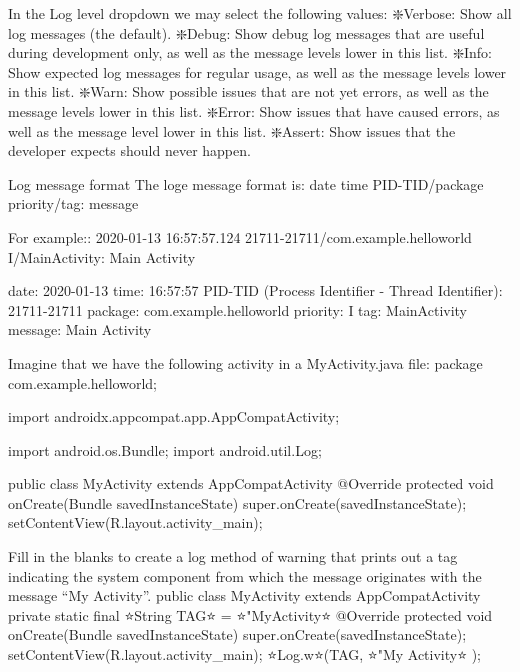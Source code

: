         In the Log level dropdown we may select the following values:
            ❇️Verbose: Show all log messages (the default).
            ❇️Debug: Show debug log messages that are useful during development only, as well as the message levels lower in this list.
            ❇️Info: Show expected log messages for regular usage, as well as the message levels lower in this list.
            ❇️Warn: Show possible issues that are not yet errors, as well as the message levels lower in this list.
            ❇️Error: Show issues that have caused errors, as well as the message level lower in this list.
            ❇️Assert: Show issues that the developer expects should never happen.

    Log message format
        The loge message format is:
            date time PID-TID/package priority/tag: message

        For example::
            2020-01-13 16:57:57.124 21711-21711/com.example.helloworld I/MainActivity: Main Activity

        date: 2020-01-13
        time: 16:57:57
        PID-TID (Process Identifier - Thread Identifier): 21711-21711
        package: com.example.helloworld
        priority: I
        tag: MainActivity
        message: Main Activity


        Imagine that we have the following activity in a MyActivity.java file:
            package com.example.helloworld;
            
            import androidx.appcompat.app.AppCompatActivity;
            
            import android.os.Bundle;
            import android.util.Log;
            
            public class MyActivity extends AppCompatActivity {
                @Override
                protected void onCreate(Bundle savedInstanceState) {
                    super.onCreate(savedInstanceState);
                    setContentView(R.layout.activity_main);
                }
            }

        Fill in the blanks to create a log method of warning that prints out a tag indicating the system component from which the message originates with the message “My Activity”.
            public class MyActivity extends AppCompatActivity {
                private static final ⭐String TAG⭐ = ⭐"MyActivity⭐ 
                @Override
                protected void onCreate(Bundle savedInstanceState) {
                    super.onCreate(savedInstanceState);
                    setContentView(R.layout.activity_main);
                    ⭐Log.w⭐(TAG, ⭐"My Activity⭐ );
                }
            }

